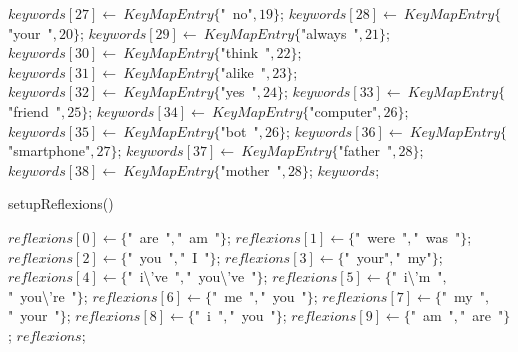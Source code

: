 \documentclass[a4paper,10pt]{article}
\begin{document}
\begin{algorithm}
\begin{algorithmic}[5]
  \STATE \(keywords[27]\gets\ KeyMapEntry\{\)"{}\ no"{}\(,19\}\);
  \STATE \(keywords[28]\gets\ KeyMapEntry\{\)"{}your\ "{}\(,20\}\);
  \STATE \(keywords[29]\gets\ KeyMapEntry\{\)"{}always\ "{}\(,21\}\);
  \STATE \(keywords[30]\gets\ KeyMapEntry\{\)"{}think\ "{}\(,22\}\);
  \STATE \(keywords[31]\gets\ KeyMapEntry\{\)"{}alike\ "{}\(,23\}\);
  \STATE \(keywords[32]\gets\ KeyMapEntry\{\)"{}yes\ "{}\(,24\}\);
  \STATE \(keywords[33]\gets\ KeyMapEntry\{\)"{}friend\ "{}\(,25\}\);
  \STATE \(keywords[34]\gets\ KeyMapEntry\{\)"{}computer"{}\(,26\}\);
  \STATE \(keywords[35]\gets\ KeyMapEntry\{\)"{}bot\ "{}\(,26\}\);
  \STATE \(keywords[36]\gets\ KeyMapEntry\{\)"{}smartphone"{}\(,27\}\);
  \STATE \(keywords[37]\gets\ KeyMapEntry\{\)"{}father\ "{}\(,28\}\);
  \STATE \(keywords[38]\gets\ KeyMapEntry\{\)"{}mother\ "{}\(,28\}\);
  \RETURN\(keywords\);

\end{algorithmic}
\end{algorithm}


\begin{algorithm}
\caption{setupReflexions()}
\begin{algorithmic}[5]

\STATE {}
  \STATE \(reflexions[0]\gets\{\)"{}\ are\ "{}\(,\)"{}\ am\ "{}\(\}\);
  \STATE \(reflexions[1]\gets\{\)"{}\ were\ "{}\(,\)"{}\ was\ "{}\(\}\);
  \STATE \(reflexions[2]\gets\{\)"{}\ you\ "{}\(,\)"{}\ I\ "{}\(\}\);
  \STATE \(reflexions[3]\gets\{\)"{}\ your"{}\(,\)"{}\ my"{}\(\}\);
  \STATE \(reflexions[4]\gets\{\)"{}\ i\textbackslash{}'{}ve\ "{}\(,\)"{}\ you\textbackslash{}'{}ve\ "{}\(\}\);
  \STATE \(reflexions[5]\gets\{\)"{}\ i\textbackslash{}'{}m\ "{}\(,\)"{}\ you\textbackslash{}'{}re\ "{}\(\}\);
  \STATE \(reflexions[6]\gets\{\)"{}\ me\ "{}\(,\)"{}\ you\ "{}\(\}\);
  \STATE \(reflexions[7]\gets\{\)"{}\ my\ "{}\(,\)"{}\ your\ "{}\(\}\);
  \STATE \(reflexions[8]\gets\{\)"{}\ i\ "{}\(,\)"{}\ you\ "{}\(\}\);
  \STATE \(reflexions[9]\gets\{\)"{}\ am\ "{}\(,\)"{}\ are\ "{}\(\}\);
  \RETURN\(reflexions\);

\end{algorithmic}
\end{algorithm}
\end{document}
